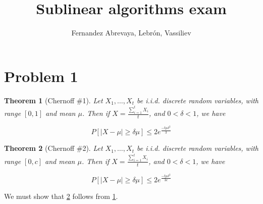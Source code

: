 \documentclass[11pt]{amsart}
\title{Sublinear algorithms exam}
\author{Fernandez Abrevaya, Lebrón, Vassiliev}
\newtheorem{theorem}{Theorem}[section]
\begin{document}
\maketitle

\section*{Problem 1}
\addtocounter{section}{1}
\setcounter{theorem}{0}


\begin{theorem}[Chernoff \#1]\label{cher1}
Let $X_1, \dots, X_t$ be i.i.d. discrete random variables, with range $[0, 1]$ and mean $\mu$. Then if $X = \frac{\sum_{i=1}^t X_i}{t}$, and $0 < \delta < 1$, we have

$$
P[|X - \mu| \ge \delta \mu] \le 2 e^{\frac{-t \mu \delta^2}{3}}
$$
\end{theorem}
\medskip

\begin{theorem}[Chernoff \#2]\label{cher2}
Let $X_1, \dots, X_t$ be i.i.d. discrete random variables, with range $[0, c]$ and mean $\mu$. Then if $X = \frac{\sum_{i=1}^t X_i}{t}$, and $0 < \delta < 1$, we have

$$
P[|X - \mu| \ge \delta \mu] \le 2 e^{\frac{-t \mu \delta^2}{3c}}
$$
\end{theorem}
\medskip
We must show that \ref{cher2} follows from \ref{cher1}.

\bigskip
\end{document}
